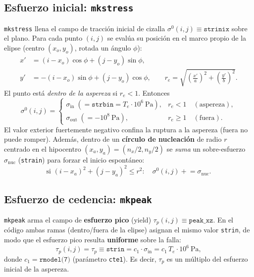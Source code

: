 \documentclass[11pt,a4paper]{article}
\begin{document}
\subsection{Esfuerzo inicial: \texttt{mkstress}}
\texttt{mkstress} llena el campo de tracción inicial de cizalla
$\sigma^0(i,j)\equiv\texttt{strinix}$ sobre el plano. Para cada punto $(i,j)$ se
evalúa su posición en el marco propio de la elipse (centro $(x_o,y_o)$, rotada un
ángulo $\phi$):
\begin{align}
  x' &= (i-x_o)\cos\phi + (j-y_o)\sin\phi, \\
  y' &= -(i-x_o)\sin\phi + (j-y_o)\cos\phi, \qquad
  r_e = \sqrt{\left(\tfrac{x'}{a}\right)^2+\left(\tfrac{y'}{b}\right)^2}.
\end{align}
El punto está \emph{dentro de la aspereza} si $r_e<1$. Entonces
\begin{equation}
  \sigma^0(i,j)=
  \begin{cases}
    \sigma_{\text{in}} \;(=\texttt{strbin}=T_e\cdot 10^6\ \text{Pa}), & r_e<1 \quad(\text{aspereza}),\\[2pt]
    \sigma_{\text{out}}\;(=-10^{8}\ \text{Pa}), & r_e\ge 1\quad(\text{fuera}).
  \end{cases}
\end{equation}
El valor exterior fuertemente negativo confina la ruptura a la aspereza (fuera no
puede romper). Además, dentro de un \textbf{círculo de nucleación} de radio $r$
centrado en el hipocentro $(x_a,y_a)=(n_x/2,n_y/2)$ se \emph{suma} un sobre-esfuerzo
$\sigma_{\text{nuc}}$ (\texttt{strain}) para forzar el inicio espontáneo:
\begin{equation}
  \text{si } (i-x_a)^2+(j-y_a)^2 \le r^2:\quad \sigma^0(i,j)\mathrel{+}= \sigma_{\text{nuc}}.
\end{equation}

\subsection{Esfuerzo de cedencia: \texttt{mkpeak}}
\texttt{mkpeak} arma el campo de \textbf{esfuerzo pico} (yield) $\tau_p(i,j)
\equiv\texttt{peak\_xz}$. En el código ambas ramas (dentro/fuera de la elipse)
asignan el mismo valor \texttt{strin}, de modo que el esfuerzo pico resulta
\textbf{uniforme} sobre la falla:
\begin{equation}
  \tau_p(i,j) = \tau_p \equiv \texttt{strin} = c_1\cdot \sigma_{\text{in}}
              = c_1\,T_e\cdot 10^6\ \text{Pa},
\end{equation}
donde $c_1=\texttt{rmodel(7)}$ (parámetro \texttt{cte1}). Es decir, $\tau_p$ es un
múltiplo del esfuerzo inicial de la aspereza.
\end{document}
